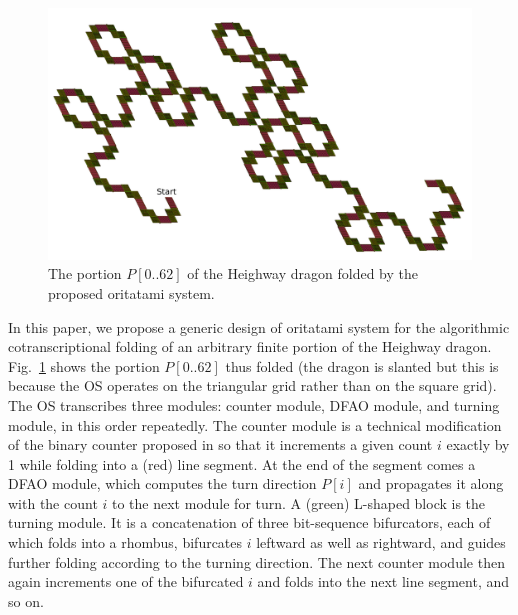 \documentclass[runningheads]{llncs}
\begin{document}
\begin{figure}
\vspace*{-5mm}
\centering
\includegraphics[width=\linewidth]{Figs/6bit_heighway.pdf}
\caption{The portion $P[0 .. 62]$ of the Heighway dragon folded by the proposed oritatami system.}
\label{fig:heighway6_oritatami}
\vspace*{-5mm}
\end{figure}

In this paper, we propose a generic design of oritatami system for the algorithmic cotranscriptional folding of an arbitrary finite portion of the Heighway dragon. 
Fig.~\ref{fig:heighway6_oritatami} shows the portion $P[0 .. 62]$ thus folded (the dragon is slanted but this is because the OS operates on the triangular grid rather than on the square grid). 
The OS transcribes three modules: counter module, DFAO module, and turning module, in this order repeatedly. 
The counter module is a technical modification of the binary counter proposed in \cite{GeMeScSe2016} so that it increments a given count $i$ exactly by 1 while folding into a (red) line segment. 
At the end of the segment comes a DFAO module, which computes the turn direction $P[i]$ and propagates it along with the count $i$ to the next module for turn.  
A (green) L-shaped block is the turning module. 
It is a concatenation of three bit-sequence bifurcators, each of which folds into a rhombus, bifurcates $i$ leftward as well as rightward, and guides further folding according to the turning direction. 
The next counter module then again increments one of the bifurcated $i$ and folds into the next line segment, and so on. 
\end{document}
